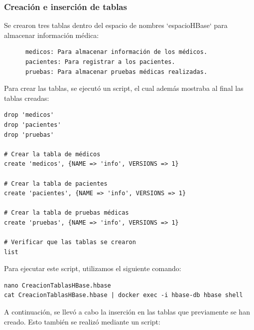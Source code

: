 \documentclass{article}
\begin{document}
\subsubsection{Creación e inserción de tablas}

Se crearon tres tablas dentro del espacio de nombres `espacioHBase` para almacenar información médica: 

\begin{verbatim}
      medicos: Para almacenar información de los médicos.
      pacientes: Para registrar a los pacientes.
      pruebas: Para almacenar pruebas médicas realizadas.
\end{verbatim}

Para crear las tablas, se ejecutó un script, el cual además mostraba al final las tablas creadas:

\begin{verbatim}
drop 'medicos'
drop 'pacientes'
drop 'pruebas'
    
# Crear la tabla de médicos
create 'medicos', {NAME => 'info', VERSIONS => 1}
    
# Crear la tabla de pacientes
create 'pacientes', {NAME => 'info', VERSIONS => 1}
    
# Crear la tabla de pruebas médicas
create 'pruebas', {NAME => 'info', VERSIONS => 1}
    
# Verificar que las tablas se crearon
list    
\end{verbatim}

Para ejecutar este script, utilizamos el siguiente comando:
\begin{lstlisting}[style=bashStyle]
nano CreacionTablasHBase.hbase
cat CreacionTablasHBase.hbase | docker exec -i hbase-db hbase shell
\end{lstlisting}

A continuación, se llevó a cabo la inserción en las tablas que previamente se han creado. Esto también se realizó mediante un script:
\end{document}
